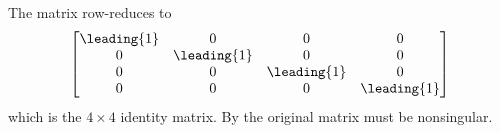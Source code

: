 The matrix row-reduces to
\begin{equation*}
\begin{bmatrix}
\leading{1}&  0 &  0 &  0\\ 
0 & \leading{1} &  0 &  0\\ 
0 &  0 & \leading{1} &  0\\ 
0 &  0 &  0 & \leading{1}
\end{bmatrix}
\end{equation*}
which is the $4\times 4$ identity matrix.  By  the original matrix must be nonsingular.